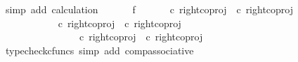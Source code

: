 \begin{isabellebody}
\ {\isacharparenleft}{\kern0pt}simp\ add{\isacharcolon}{\kern0pt}\ calculation{\isacharparenright}{\kern0pt}\isanewline
\ \ \isamarkupfalse%
\isanewline
\ \ \isamarkupfalse%
\ f{}{\isacharcolon}{\kern0pt}\ {\isachardoublequoteopen}{\isasymlangle}{\isasymt}{\isacharcomma}{\kern0pt}{\isasymt}{\isasymrangle}\ {\isasymamalg}\ {\isasymlangle}{\isasymf}{\isacharcomma}{\kern0pt}\ {\isasymf}{\isasymrangle}\ {\isasymamalg}\ {\isasymlangle}{\isasymf}{\isacharcomma}{\kern0pt}{\isasymt}{\isasymrangle}\ {\isasymcirc}\isactrlsub c\ {\isacharparenleft}{\kern0pt}right{\isacharunderscore}{\kern0pt}coproj\ {\isasymone}\ {\isacharparenleft}{\kern0pt}{\isasymone}{\isasymCoprod}{\isasymone}{\isacharparenright}{\kern0pt}{\isasymcirc}\isactrlsub c\ right{\isacharunderscore}{\kern0pt}coproj\ {\isasymone}\ {\isasymone}{\isacharparenright}{\kern0pt}\ {\isacharequal}{\kern0pt}\ {\isasymlangle}{\isasymf}{\isacharcomma}{\kern0pt}{\isasymt}{\isasymrangle}{\isachardoublequoteclose}\isanewline
\ \ \isamarkupfalse%
{\isacharminus}{\kern0pt}\ \isanewline
\ \ \ \ \isamarkupfalse%
\ {\isachardoublequoteopen}{\isasymlangle}{\isasymt}{\isacharcomma}{\kern0pt}{\isasymt}{\isasymrangle}\ {\isasymamalg}\ {\isasymlangle}{\isasymf}{\isacharcomma}{\kern0pt}\ {\isasymf}{\isasymrangle}\ {\isasymamalg}\ {\isasymlangle}{\isasymf}{\isacharcomma}{\kern0pt}{\isasymt}{\isasymrangle}\ {\isasymcirc}\isactrlsub c\ right{\isacharunderscore}{\kern0pt}coproj\ {\isasymone}\ {\isacharparenleft}{\kern0pt}{\isasymone}{\isasymCoprod}{\isasymone}{\isacharparenright}{\kern0pt}{\isasymcirc}\isactrlsub c\ right{\isacharunderscore}{\kern0pt}coproj\ {\isasymone}\ {\isasymone}\ {\isacharequal}{\kern0pt}\ \isanewline
\ \ \ \ \ \ \ \ \ \ {\isacharparenleft}{\kern0pt}{\isasymlangle}{\isasymt}{\isacharcomma}{\kern0pt}{\isasymt}{\isasymrangle}\ {\isasymamalg}\ {\isasymlangle}{\isasymf}{\isacharcomma}{\kern0pt}\ {\isasymf}{\isasymrangle}\ {\isasymamalg}\ {\isasymlangle}{\isasymf}{\isacharcomma}{\kern0pt}{\isasymt}{\isasymrangle}\ {\isasymcirc}\isactrlsub c\ right{\isacharunderscore}{\kern0pt}coproj\ {\isasymone}\ {\isacharparenleft}{\kern0pt}{\isasymone}{\isasymCoprod}{\isasymone}{\isacharparenright}{\kern0pt}{\isacharparenright}{\kern0pt}{\isasymcirc}\isactrlsub c\ right{\isacharunderscore}{\kern0pt}coproj\ {\isasymone}\ {\isasymone}{\isachardoublequoteclose}\isanewline
\ \ \ \ \ \ \isamarkupfalse%
\ {\isacharparenleft}{\kern0pt}typecheck{\isacharunderscore}{\kern0pt}cfuncs{\isacharcomma}{\kern0pt}\ simp\ add{\isacharcolon}{\kern0pt}\ comp{\isacharunderscore}{\kern0pt}associative{}{\isacharparenright}{\kern0pt}\isanewline

\end{isabellebody}
